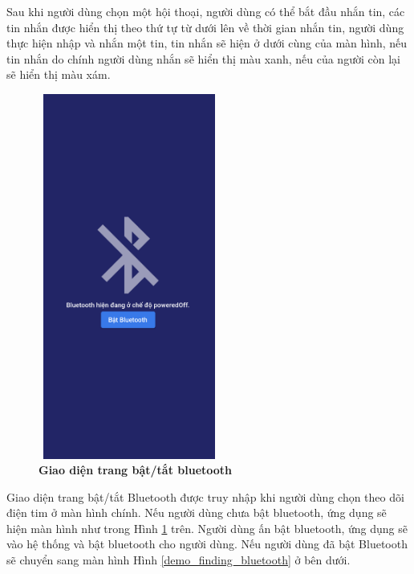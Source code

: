 Sau khi người dùng chọn một hội thoại, người dùng có thể bắt đầu nhắn tin, các tin nhắn được hiển thị theo thứ tự từ dưới lên về
thời gian nhắn tin, người dùng thực hiện nhập và nhắn một tin, tin nhắn sẽ hiện ở dưới cùng của màn hình, nếu tin nhắn do
chính người dùng nhắn sẽ hiển thị màu xanh, nếu của người còn lại sẽ hiển thị màu xám.

\begin{figure}[H]
  \centering
  \includegraphics[width=6cm,height=12cm]{Images/mobile_app/demo/off_bluetooth.png}
  \caption[Giao diện trang bật/tắt bluetooth]{\bfseries \fontsize{12pt}{0pt}\selectfont Giao diện trang bật/tắt bluetooth}
  \label{demo_off_bluetooth}
\end{figure}

Giao diện trang bật/tắt Bluetooth được truy nhập khi người dùng chọn theo dõi điện tim ở màn hình chính. Nếu người dùng chưa
bật bluetooth, ứng dụng sẽ hiện màn hình như trong Hình \ref{demo_off_bluetooth} trên. Người dùng ấn bật bluetooth, ứng dụng
sẽ vào hệ thống và bật bluetooth cho người dùng. Nếu người dùng đã bật Bluetooth sẽ chuyển sang màn hình Hình \ref{demo_finding_bluetooth}
ở bên dưới.

